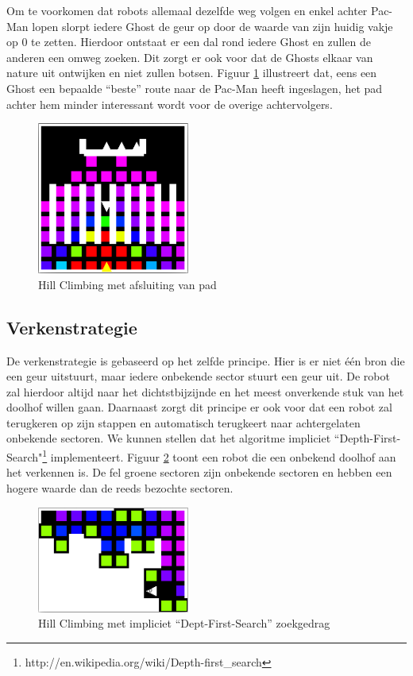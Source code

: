 \documentclass[12pt,a4paper]{report}
\begin{document}
Om te voorkomen dat robots allemaal dezelfde weg volgen en enkel achter Pac-Man lopen slorpt iedere Ghost de geur op door de waarde van zijn huidig vakje op 0 te zetten. Hierdoor ontstaat er een dal rond iedere Ghost en zullen de anderen een omweg zoeken. Dit zorgt er ook voor dat de Ghosts elkaar van nature uit ontwijken en niet zullen botsen. Figuur \ref{fig:hillclimbing2} illustreert dat, eens een Ghost een bepaalde ``beste'' route naar de Pac-Man heeft ingeslagen, het pad achter hem minder interessant wordt voor de overige achtervolgers.

\begin{figure}[htbp]
  \centering
  \includegraphics[width=50mm]{resources/hillclimbing2.png}
  \caption{Hill Climbing met afsluiting van pad}
  \label{fig:hillclimbing2}
\end{figure}

\subsection{Verkenstrategie}

De verkenstrategie is gebaseerd op het zelfde principe. Hier is er niet \'e\'en bron die een geur uitstuurt, maar iedere onbekende sector stuurt een geur uit. De robot zal hierdoor altijd naar het dichtstbijzijnde en het meest onverkende stuk van het doolhof willen gaan. Daarnaast zorgt dit principe er ook voor dat een robot zal terugkeren op zijn stappen en automatisch terugkeert naar achtergelaten onbekende sectoren. We kunnen stellen dat het algoritme impliciet ``Depth-First-Search"\footnote{http://en.wikipedia.org/wiki/Depth-first\_search} implementeert. Figuur \ref{fig:dfs} toont een robot die een onbekend doolhof aan het verkennen is. De fel groene sectoren zijn onbekende sectoren en hebben een hogere waarde dan de reeds bezochte sectoren.

\begin{figure}[htbp]
  \centering
  \includegraphics[width=50mm]{resources/dfs.png}
  \caption{Hill Climbing met impliciet ``Dept-First-Search'' zoekgedrag}
  \label{fig:dfs}
\end{figure}
\end{document}
